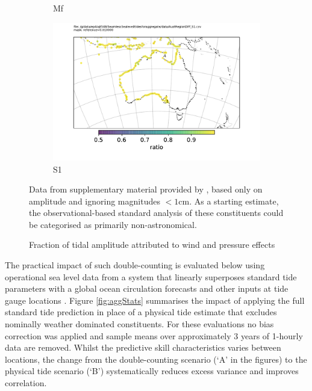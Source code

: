 \begin{figure}[!hbt]
\begin{subfigure}[b]{\figwidthHalf}
        \caption{Mf}
    \end{subfigure}
    \begin{subfigure}[b]{\figwidthHalf}
        \includegraphics[width=\textwidth]{figures/maps/AustRegionDiff_S1.pdf}
        \caption{S1}
    \end{subfigure}
    \caption{Fraction of tidal amplitude attributed to wind and pressure effects}
    {Data from supplementary material provided by \citet{10.5194/os-2020-107}, based only on amplitude and ignoring magnitudes $<1$cm.  As a starting estimate, the observational-based standard analysis of these constituents could be categorised as primarily non-astronomical.}
    \label{fig:williamsFraction}
\end{figure}

The practical impact of such double-counting is evaluated below using operational sea level data from a system that linearly superposes standard tide parameters with a global ocean circulation forecasts and other inputs at tide gauge locations \citep{Taylor:2017coa}\citep{10.1080/1755876x.2019.1685834}.
Figure \ref{fig:aggStats} summarises the impact of applying the full standard tide prediction 
in place of a physical tide estimate that excludes nominally weather dominated constituents.
For these evaluations no bias correction was applied and sample means over approximately 3 years of 1-hourly data are removed.  Whilst the predictive skill characteristics varies between locations, the change from the double-counting scenario (`A' in the figures) to the physical tide scenario (`B') systematically reduces excess variance and improves correlation.

